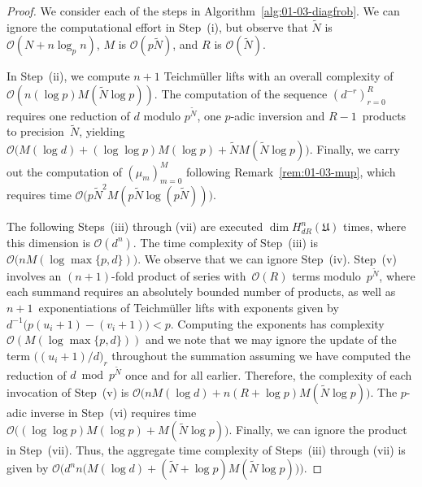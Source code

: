 \begin{proof}
We consider each of the steps in Algorithm~\ref{alg:01-03-diagfrob}. 
We can ignore the computational effort in {Step~(i)}, but observe 
that $\tilde{N}$ is $\mathcal{O}(N + n \log_p n)$, $M$ is 
$\mathcal{O}(p \tilde{N})$, and $R$ is $\mathcal{O}(\tilde{N})$.  

In {Step~(ii)}, we compute $n+1$ Teichm\"uller lifts with an 
overall complexity of $\mathcal{O}(n (\log p) M(\tilde{N} \log p))$. 
The computation of the sequence $(d^{-r})_{r=0}^{R}$ requires 
one reduction of $d$ modulo $p^{\tilde{N}}$, one $p$-adic inversion 
and $R-1$~products to precision~$\tilde{N}$, yielding 
$\mathcal{O}\bigl(M(\log d) + (\log \log p) M(\log p) + \tilde{N} M(\tilde{N} \log p)\bigr)$. 
Finally, we carry out the computation of $(\mu_m)_{m=0}^{M}$ following 
Remark~\ref{rem:01-03-mup}, which requires time 
$\mathcal{O}\bigl(p \tilde{N}^2 M(p \tilde{N} \log(p \tilde{N}))\bigr)$.

The following {Steps~(iii) through (vii)} are executed 
$\dim H_{dR}^{n}(\mathfrak{U})$ times, where this dimension 
is $\mathcal{O}(d^n)$.
The time complexity of {Step~(iii)} is 
$\mathcal{O}\bigl(n M(\log \max\{p,d\})\bigr)$.
We observe that we can ignore {Step~(iv)}.
Step~(v) involves an $(n+1)$-fold product of series 
with~$\mathcal{O}(R)$ terms modulo~$p^{\tilde{N}}$, where each summand 
requires an absolutely bounded number of products, as well as 
$n+1$~exponentiations of Teichm\"uller lifts with exponents given 
by $d^{-1} \bigl(p (u_i+1) - (v_i+1)\bigr) < p$.  Computing the 
exponents has complexity $\mathcal{O}(M(\log \max\{p,d\}))$ and 
we note that we may ignore the update of the term 
\mbox{$\bigl((u_i+1)/d\bigr)_r$} throughout the summation 
assuming we have computed the reduction of $d \bmod{p^{\tilde{N}}}$ 
once and for all earlier.  Therefore, the complexity of each 
invocation of {Step~(v)} is 
$\mathcal{O}\bigl( n M(\log d) + n (R + \log p) M(\tilde{N} \log p)\bigr)$.  
The $p$-adic inverse in {Step~(vi)} requires time 
$\mathcal{O}\bigl((\log \log p) M(\log p) + M(\tilde{N} \log p)\bigr)$.
Finally, we can ignore the product in {Step~(vii)}.  
Thus, the aggregate time complexity of {Steps~(iii)} through {(vii)} 
is given by 
$\mathcal{O}\bigl(d^n n \bigl( M(\log d) + (\tilde{N} + \log p) M(\tilde{N} \log p) \bigr)\bigr)$.
\end{proof}

